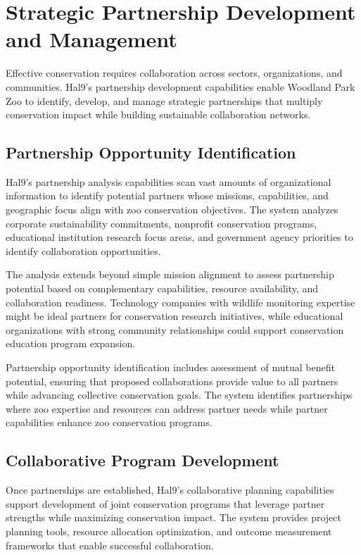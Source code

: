 \documentclass[
  Letterpaper,
]{scrbook}
\begin{document}
\section{Strategic Partnership Development and
Management}\label{strategic-partnership-development-and-management}

Effective conservation requires collaboration across sectors,
organizations, and communities. Hal9's partnership development
capabilities enable Woodland Park Zoo to identify, develop, and manage
strategic partnerships that multiply conservation impact while building
sustainable collaboration networks.

\subsection{Partnership Opportunity
Identification}\label{partnership-opportunity-identification}

Hal9's partnership analysis capabilities scan vast amounts of
organizational information to identify potential partners whose
missions, capabilities, and geographic focus align with zoo conservation
objectives. The system analyzes corporate sustainability commitments,
nonprofit conservation programs, educational institution research focus
areas, and government agency priorities to identify collaboration
opportunities.

The analysis extends beyond simple mission alignment to assess
partnership potential based on complementary capabilities, resource
availability, and collaboration readiness. Technology companies with
wildlife monitoring expertise might be ideal partners for conservation
research initiatives, while educational organizations with strong
community relationships could support conservation education program
expansion.

Partnership opportunity identification includes assessment of mutual
benefit potential, ensuring that proposed collaborations provide value
to all partners while advancing collective conservation goals. The
system identifies partnerships where zoo expertise and resources can
address partner needs while partner capabilities enhance zoo
conservation programs.

\subsection{Collaborative Program
Development}\label{collaborative-program-development}

Once partnerships are established, Hal9's collaborative planning
capabilities support development of joint conservation programs that
leverage partner strengths while maximizing conservation impact. The
system provides project planning tools, resource allocation
optimization, and outcome measurement frameworks that enable successful
collaboration.
\end{document}
